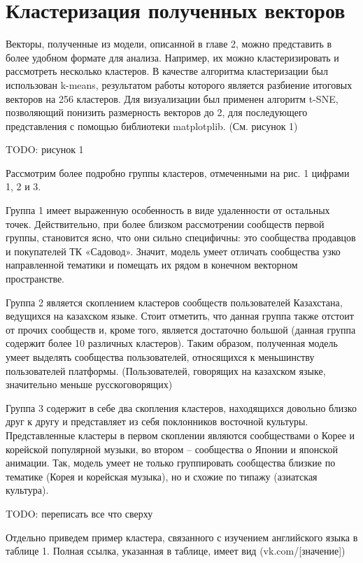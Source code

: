\documentclass[times,specification,annotation]{itmo-student-thesis}
\begin{document}
\section{Кластеризация полученных векторов}

Векторы, полученные из модели, описанной в главе 2, можно представить в
более удобном формате для анализа. Например, их можно кластеризировать и
рассмотреть несколько кластеров. В качестве алгоритма кластеризации был
использован k-means, результатом работы которого является разбиение итоговых
векторов на 256 кластеров. Для визуализации был применен алгоритм t-SNE,
позволяющий понизить размерность векторов до 2, для последующего
представления с помощью библиотеки matplotplib. (См. рисунок 1)

TODO: рисунок 1

Рассмотрим более подробно группы кластеров, отмеченными на рис. 1
цифрами 1, 2 и 3.

Группа 1 имеет выраженную особенность в виде удаленности от остальных
точек. Действительно, при более близком рассмотрении сообществ первой группы,
становится ясно, что они сильно специфичны: это сообщества продавцов и
покупателей ТК «Садовод». Значит, модель умеет отличать сообщества узко
направленной тематики и помещать их рядом в конечном векторном пространстве.

Группа 2 является скоплением кластеров сообществ пользователей
Казахстана, ведущихся на казахском языке. Стоит отметить, что данная группа
также отстоит от прочих сообществ и, кроме того, является достаточно большой
(данная группа содержит более 10 различных кластеров). Таким образом,
полученная модель умеет выделять сообщества пользователей, относящихся к
меньшинству пользователей платформы. (Пользователей, говорящих на казахском
языке, значительно меньше русскоговорящих)

Группа 3 содержит в себе два скопления кластеров, находящихся довольно
близко друг к другу и представляет из себя поклонников восточной культуры.
Представленные кластеры в первом скоплении являются сообществами о Корее и
корейской популярной музыки, во втором – сообщества о Японии и японской
анимации. Так, модель умеет не только группировать сообщества близкие по
тематике (Корея и корейская музыка), но и схожие по типажу (азиатская культура).

TODO: переписать все что сверху

Отдельно приведем пример кластера, связанного с изучением английского
языка в таблице 1. Полная ссылка, указанная в таблице, имеет вид
(vk.com/[значение])
\end{document}
